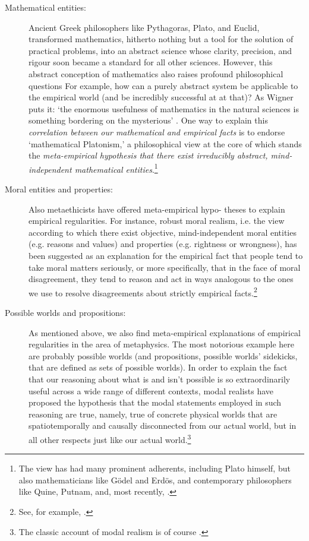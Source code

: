 \documentclass[a4paper,12pt]{article}
\begin{document}
\begin{description}

\item[Mathematical entities:]

Ancient Greek philosophers like Pythagoras, Plato, and Euclid, transformed mathematics, hitherto nothing but a tool for the solution of practical problems, into an abstract science whose clarity, precision, and rigour soon became a standard for all other sciences. However, this abstract conception of mathematics also raises profound philosophical questions For example, how can a purely abstract system be applicable to the empirical world (and be incredibly successful at at that)? As Wigner puts it: `the enormous usefulness of mathematics in the natural sciences is something bordering on the mysterious' \cite[p.~2]{Wigner1960}. One way to explain this \textit{correlation between our mathematical and empirical facts} is to endorse `mathematical Platonism,' a philosophical view at the core of which stands the \textit{meta-empirical hypothesis that there exist irreducibly abstract, mind-independent mathematical entities}.\footnote{The view has had many prominent adherents, including Plato himself, but also mathematicians like Gödel and Erdös, and contemporary philosophers like Quine, Putnam, and, most recently, \cite{Colyvan2001}.}

\item[Moral entities and properties:] 

Also metaethicists have offered meta-empirical hypo- theses to explain empirical regularities. For instance, robust moral realism, i.e. the view according to which there exist objective, mind-independent moral entities (e.g. reasons and values) and properties (e.g. rightness or wrongness), has been suggested as an explanation for the empirical fact that people tend to take moral matters seriously, or more specifically, that in the face of moral disagreement, they tend to reason and act in ways analogous to the ones we use to resolve disagreements about strictly empirical facts.\footnote{See, for example, \cite[p.~23f]{Enoch2011_Taking}.}

\item[Possible worlds and propositions:] As mentioned above, we also find meta-empirical explanations of empirical regularities in the area of metaphysics. The most notorious example here are probably possible worlds (and propositions, possible worlds' sidekicks, that are defined as sets of possible worlds). In order to explain the fact that our reasoning about what is and isn't possible is so extraordinarily useful across a wide range of different contexts, modal realists have proposed the hypothesis that the modal statements employed in such reasoning are true, namely, true of concrete physical worlds that are spatiotemporally and causally disconnected from our actual world, but in all other respects just like our actual world.\footnote{The classic account of modal realism is of course \cite{Lewis1986}.}


\end{description}
\end{document}
